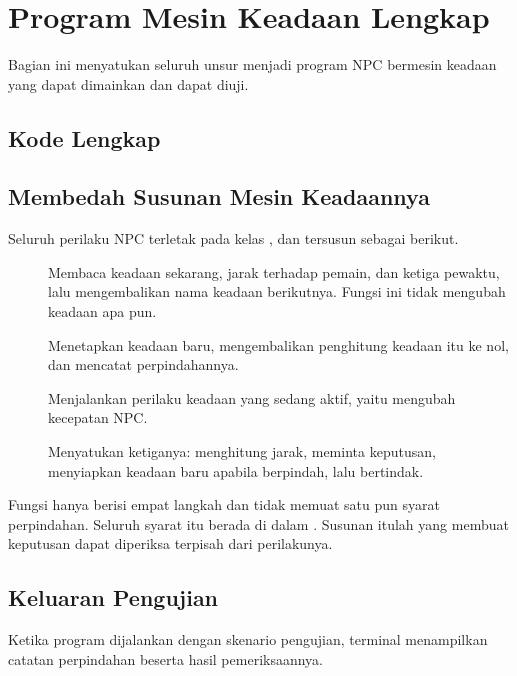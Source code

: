 \section{Program Mesin Keadaan Lengkap}
\label{sec:program-fsm}

Bagian ini menyatukan seluruh unsur menjadi program NPC bermesin keadaan yang
dapat dimainkan dan dapat diuji.

\subsection{Kode Lengkap}


\subsection{Membedah Susunan Mesin Keadaannya}

Seluruh perilaku NPC terletak pada kelas , dan tersusun sebagai
berikut.

\begin{description}
  \item[] Membaca keadaan sekarang, jarak terhadap pemain, dan
        ketiga pewaktu, lalu mengembalikan nama keadaan berikutnya. Fungsi ini
        tidak mengubah keadaan apa pun.
  \item[] Menetapkan keadaan baru, mengembalikan penghitung
        keadaan itu ke nol, dan mencatat perpindahannya.
  \item[] Menjalankan perilaku keadaan yang sedang aktif, yaitu
        mengubah kecepatan NPC.
  \item[] Menyatukan ketiganya: menghitung jarak, meminta
        keputusan, menyiapkan keadaan baru apabila berpindah, lalu bertindak.
\end{description}

Fungsi  hanya berisi empat langkah dan tidak memuat satu
pun syarat perpindahan. Seluruh syarat itu berada di dalam .
Susunan itulah yang membuat keputusan dapat diperiksa terpisah dari
perilakunya.

\subsection{Keluaran Pengujian}

Ketika program dijalankan dengan skenario pengujian, terminal menampilkan
catatan perpindahan beserta hasil pemeriksaannya.

